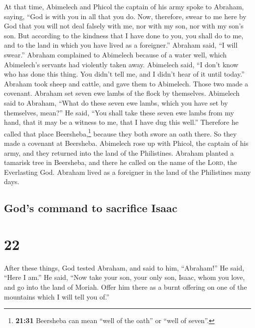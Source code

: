  At that time, Abimelech and Phicol the captain of his
army spoke to Abraham, saying, ``God is with you in all that you do.
 Now, therefore, swear to me here by God that you will
not deal falsely with me, nor with my son, nor with my son's son. But
according to the kindness that I have done to you, you shall do to me,
and to the land in which you have lived as a foreigner.''
 Abraham said, ``I will swear.''  Abraham
complained to Abimelech because of a water well, which Abimelech's
servants had violently taken away.  Abimelech said, ``I
don't know who has done this thing. You didn't tell me, and I didn't
hear of it until today.''  Abraham took sheep and cattle,
and gave them to Abimelech. Those two made a covenant. 
Abraham set seven ewe lambs of the flock by themselves. 
Abimelech said to Abraham, ``What do these seven ewe lambs, which you
have set by themselves, mean?''  He said, ``You shall
take these seven ewe lambs from my hand, that it may be a witness to me,
that I have dug this well.''  Therefore he called that
place Beersheba,\footnote{\textbf{21:31} Beersheba can mean ``well of
  the oath'' or ``well of seven''.} because they both swore an oath
there.  So they made a covenant at Beersheba. Abimelech
rose up with Phicol, the captain of his army, and they returned into the
land of the Philistines.  Abraham planted a tamarisk tree
in Beersheba, and there he called on the name of the \textsc{Lord}, the
Everlasting God.  Abraham lived as a foreigner in the
land of the Philistines many days.

\hypertarget{gods-command-to-sacrifice-isaac}{%
\subsection{God's command to sacrifice
Isaac}\label{gods-command-to-sacrifice-isaac}}

\hypertarget{section-21}{%
\section{22}\label{section-21}}

 After these things, God tested Abraham, and said to him,
``Abraham!'' He said, ``Here I am.''  He said, ``Now take
your son, your only son, Isaac, whom you love, and go into the land of
Moriah. Offer him there as a burnt offering on one of the mountains
which I will tell you of.''


